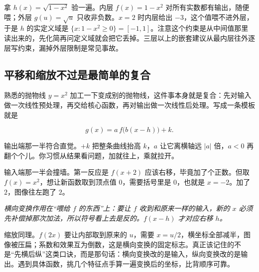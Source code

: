 拿 \(h(x)=\sqrt{1-x^2}\) 验一遍。内层 \(f(x)=1-x^2\) 对所有实数都有输出，随便喂；外层 \(g(u)=\sqrt u\) 只收非负数。\(x=2\) 时内层给出 \(-3\)，这个值喂不进外层，于是 \(h\) 的实定义域是 \(\{x:1-x^2\ge0\}=[-1,1]\)。注意这个约束是从中间值那里读出来的，先化简再问定义域就会把它丢掉。三层以上的嵌套建议从最内层往外逐层写约束，漏掉外层限制是常见事故。

\subsection{平移和缩放不过是最简单的复合}

熟悉的抛物线 \(y=x^2\) 加工一下变成别的抛物线，这件事本身就是复合：先对输入做一次线性预处理，再交给核心函数，再对输出做一次线性后处理。写成一条模板就是

\[
g(x)=a\,f\bigl(b(x-h)\bigr)+k .
\]

输出端那一半符合直觉。\(+k\) 把整条曲线抬高 \(k\)，\(a\) 让它离横轴远 \(|a|\) 倍，\(a<0\) 再翻个个儿。你习惯从结果看问题，加就往上，乘就拉开。

输入端那一半会撞墙。第一反应是 \(f(x+2)\) 应该右移，毕竟加了个正数。但取 \(f(x)=x^2\)，想让新函数取到顶点值 \(0\)，需要括号里是 \(0\)，也就是 \(x=-2\)。加了 \(2\)，图像往左跑了 \(2\)。

\begin{center}

\emph{横向变换作用在``喂给 \(f\) 的东西''上：要让 \(f\) 收到和原来一样的输入，新的 \(x\) 必须先补偿掉那次加法，所以符号看上去是反的。\(f(x-h)\) 才对应右移 \(h\)。}
\end{center}

缩放同理。\(f(2x)\) 要让内部取到原来的 \(u\)，需要 \(x=u/2\)，横坐标全部减半，图像被压扁；系数和效果互为倒数，这是横向变换的固定标志。真正该记住的不是``先横后纵''这类口诀，而是那句话：横向变换改的是输入，纵向变换改的是输出。遇到具体函数，挑几个特征点手算一遍变换后的坐标，比背顺序可靠。

